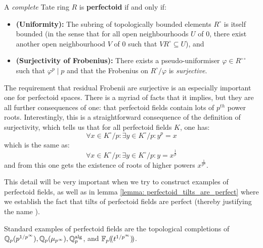                 \begin{definition} \label{def: perfectoid_fields}
                    A \textit{complete} Tate ring $R$ is \textbf{perfectoid} if and only if:
                        \begin{itemize}
                            \item \textbf{(Uniformity):} The subring of topologically bounded elements $R^{\circ}$ is itself bounded (in the sense that for all open neighbourhoods $U$ of $0$, there exist another open neighbourhood $V$ of $0$ such that $VR^{\circ} \subseteq U$), and 
                            \item \textbf{(Surjectivity of Frobenius):} There exists a pseudo-uniformiser $\varphi \in R^{\circ \circ}$ such that $\varphi^p \mid p$ and that the Frobenius on $R^{\circ}/\varphi$ is \textit{surjective}.
                        \end{itemize}
                \end{definition}
                \begin{remark} \label{remark: perfectoid_fields_have_p_power_roots}
                    The requirement that residual Frobenii are surjective is an especially important one for perfectoid spaces. There is a myriad of facts that it implies, but they are all further consequences of one: that perfectoid fields contain lots of $p^{th}$ power roots. Interestingly, this is a straightforward consequence of the definition of surjectivity, which tells us that for all perfectoid fields $K$, one has:
                        $$\forall x \in K^{\circ}/p: \exists y \in K^{\circ}/p: y^p = x$$
                    which is the same as:
                        $$\forall x \in K^{\circ}/p: \exists y \in K^{\circ}/p: y = x^{\frac1p}$$
                    and from this one gets the existence of roots of higher powers $x^{\frac{1}{p^n}}$. 
                    
                    This detail will be very important when we try to construct examples of perfectoid fields, as well as in lemma \ref{lemma: perfectoid_tilts_are_perfect} where we establish the fact that tilts of perfectoid fields are perfect (thereby justifying the name ).
                \end{remark}
                \begin{example} \label{example: perfectoid_rings_and_fields}
                    Standard examples of perfectoid fields are the topological completions of $\mathbb{Q}_p(p^{1/p^{\infty}}), \mathbb{Q}_p(\mu_{p^{\infty}}), \mathbb{Q}_p^{\mathrm{alg}}$, and $\mathbb{F}_p(\!(t^{1/p^{\infty}})\!)$.
                \end{example}
                
